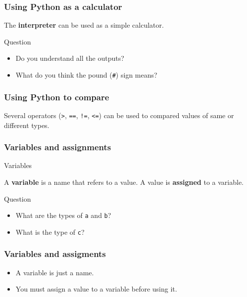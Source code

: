 \documentclass[xcolor=dvipsnames]{beamer}
\begin{document}
\begin{frame}
\frametitle{Using Python as a calculator}

The \textbf{interpreter} can be used as a simple calculator.

\vspace{1em}


\vspace{1em}
\begin{alertblock}{Question}
\begin{itemize}
\item Do you understand all the outputs?
\item What do you think the pound (\texttt{\#}) sign means?
\end{itemize}
\end{alertblock}
\end{frame}


\begin{frame}
\frametitle{Using Python to compare}

Several operators (\texttt{>}, \texttt{==}, \texttt{!=}, \texttt{<=}) can be
used to compared values of same or different types.

\vspace{1em}

\end{frame}

\begin{frame}
\frametitle{Variables and assignments}
\begin{block}{Variables}

A \textbf{variable} is a name that refers to a value.
A value is \textbf{assigned} to a variable.
\end{block}
\vspace{1em}


\vspace{1em}
\begin{alertblock}{Question}
\begin{itemize}
\item What are the types of \texttt{a} and \texttt{b}?
\item What is the type of \texttt{c}?
\end{itemize}
\end{alertblock}
\end{frame}

\begin{frame}
\frametitle{Variables and assigments}
\begin{itemize}
\item A variable is just a name.
\item You must assign a value to a variable before using it.
\end{itemize}

\end{frame}
\end{document}
